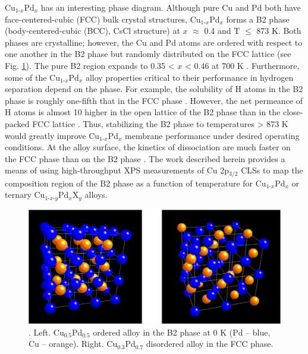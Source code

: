 \documentclass[number, sort&compress, review, 12pt]{elsarticle}
\begin{document}
Cu$_{\text{1-}x}$Pd$_x$ has an interesting phase diagram. Although pure Cu and Pd both have face-centered-cubic (FCC) bulk crystal structures, Cu$_{\text{1-}x}$Pd$_x$ forms a B2 phase (body-centered-cubic (BCC), CsCl structure) at $x$ $\approx$ 0.4 and T $\le$ 873 K. Both phases are crystalline; however, the Cu and Pd atoms are ordered with respect to one another in the B2 phase but randomly distributed on the FCC lattice (see Fig. \ref{fig-struc}). The pure B2 region expands to 0.35 \textless{} $x$ \textless{} 0.46 at 700 K \cite{subramanian-1991-cu-pd-pallad}. Furthermore, some of the Cu$_{\text{1-}x}$Pd$_x$ alloy properties critical to their performance in hydrogen separation depend on the phase. For example, the solubility of H atoms in the B2 phase is roughly one-fifth that in the FCC phase \cite{martin-2013-measur-hydrog}. However, the net permeance of H atoms is almost 10\texttimes{} higher in the open lattice of the B2 phase than in the close-packed FCC lattice \cite{kamakoti-2005-predic-hydrog}. Thus, stabilizing the B2 phase to temperatures \textgreater{} 873 K would greatly improve Cu$_{\text{1-}x}$Pd$_x$ membrane performance under desired operating conditions. At the alloy surface, the kinetics of  dissociation are much faster on the FCC phase than on the B2 phase \cite{obrien-2011-kinet-h}. The work described herein provides a means of using high-throughput XPS measurements of Cu 2p$_{\text{3/2}}$ CLSs to map the composition region of the B2 phase as a function of temperature for Cu$_{\text{1-}x}$Pd$_x$ or ternary Cu$_{\text{1-}x\text{-}y}$Pd$_x$X$_y$ alloys.

\begin{figure}[htb]
\centering
\includegraphics[width=.9\linewidth]{b2-fcc}
\caption{.  Left. Cu$_{\text{0.5}}$Pd$_{\text{0.5}}$ ordered alloy in the B2 phase at 0 K (Pd – blue, Cu – orange).  Right. Cu$_{\text{0.3}}$Pd$_{\text{0.7}}$ disordered alloy in the FCC phase. \label{fig-struc}}
\end{figure}
\end{document}
